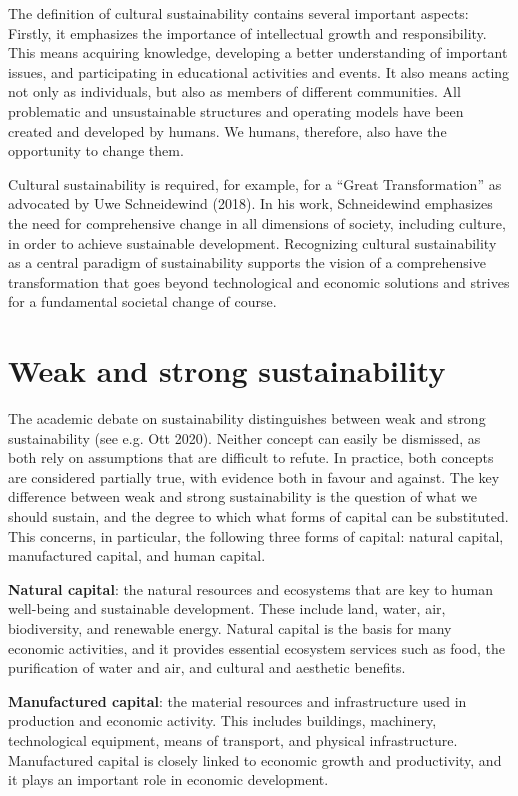 \documentclass[
  a4paper,
  DIV=11,
  numbers=noendperiod,
  oneside,
  openany]{scrreprt}
\begin{document}
The definition of cultural sustainability contains several important
aspects: Firstly, it emphasizes the importance of intellectual growth
and responsibility. This means acquiring knowledge, developing a better
understanding of important issues, and participating in educational
activities and events. It also means acting not only as individuals, but
also as members of different communities. All problematic and
unsustainable structures and operating models have been created and
developed by humans. We humans, therefore, also have the opportunity to
change them.

Cultural sustainability is required, for example, for a ``Great
Transformation'' as advocated by Uwe Schneidewind (2018). In his work,
Schneidewind emphasizes the need for comprehensive change in all
dimensions of society, including culture, in order to achieve
sustainable development. Recognizing cultural sustainability as a
central paradigm of sustainability supports the vision of a
comprehensive transformation that goes beyond technological and economic
solutions and strives for a fundamental societal change of course.

\section{Weak and strong
sustainability}\label{weak-and-strong-sustainability}

The academic debate on sustainability distinguishes between weak and
strong sustainability (see e.g. Ott 2020). Neither concept can easily be
dismissed, as both rely on assumptions that are difficult to refute. In
practice, both concepts are considered partially true, with evidence
both in favour and against. The key difference between weak and strong
sustainability is the question of what we should sustain, and the degree
to which what forms of capital can be substituted. This concerns, in
particular, the following three forms of capital: natural capital,
manufactured capital, and human capital.

\textbf{Natural capital}: the natural resources and ecosystems that are
key to human well-being and sustainable development. These include land,
water, air, biodiversity, and renewable energy. Natural capital is the
basis for many economic activities, and it provides essential ecosystem
services such as food, the purification of water and air, and cultural
and aesthetic benefits.

\textbf{Manufactured capital}: the material resources and infrastructure
used in production and economic activity. This includes buildings,
machinery, technological equipment, means of transport, and physical
infrastructure. Manufactured capital is closely linked to economic
growth and productivity, and it plays an important role in economic
development.
\end{document}
